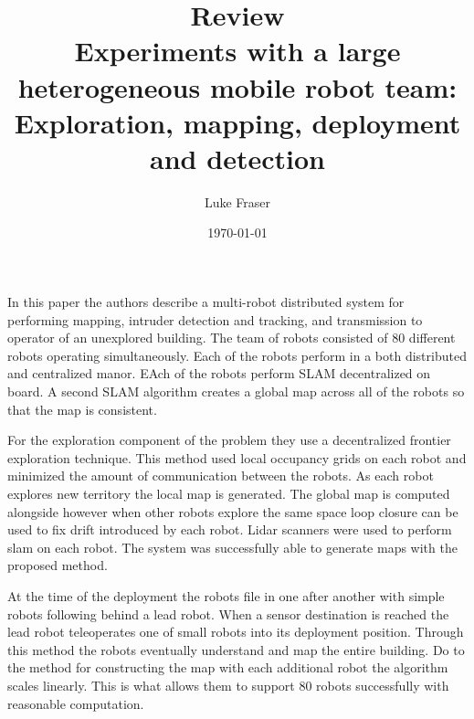 \documentclass{article}
\begin{document}
\title{{\large Review} \\ Experiments with a large heterogeneous mobile robot team: Exploration, mapping, deployment and detection}
\author{Luke Fraser}
\date{\today}
\maketitle

\begingroup
\renewcommand{\section}[2]{}


\endgroup

\section*{Summary}
In this paper the authors describe a multi-robot distributed system for performing mapping, intruder detection and tracking, and transmission to operator of an unexplored building. The team of robots consisted of 80 different robots operating simultaneously. Each of the robots perform in a both distributed and centralized manor. EAch of the robots perform SLAM decentralized on board. A second SLAM algorithm creates a global map across all of the robots so that the map is consistent.

For the exploration component of the problem they use a decentralized frontier exploration technique. This method used local occupancy grids on each robot and minimized the amount of communication between the robots. As each robot explores new territory the local map is generated. The global map is computed alongside however when other robots explore the same space loop closure can be used to fix drift introduced by each robot. Lidar scanners were used to perform slam on each robot. The system was successfully able to generate maps with the proposed method.

At the time of the deployment the robots file in one after another with simple robots following behind a lead robot. When a sensor destination is reached the lead robot teleoperates one of small robots into its deployment position. Through this method the robots eventually understand and map the entire building. Do to the method for constructing the map with each additional robot the algorithm scales linearly. This is what allows them to support 80 robots successfully with reasonable computation.
\end{document}
